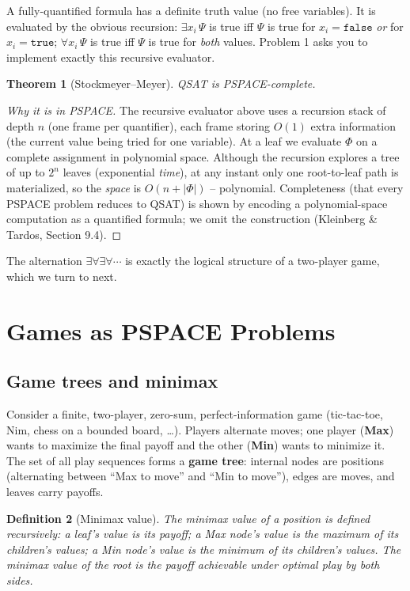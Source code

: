\documentclass[11pt]{article}
\newtheorem{theorem}{Theorem}[section]
\newtheorem{definition}[theorem]{Definition}
\begin{document}
A fully-quantified formula has a definite truth value (no free variables). It
is evaluated by the obvious recursion: $\exists x_i\,\Psi$ is true iff $\Psi$
is true for $x_i=\texttt{false}$ \emph{or} for $x_i=\texttt{true}$;
$\forall x_i\,\Psi$ is true iff $\Psi$ is true for \emph{both} values. Problem
1 asks you to implement exactly this recursive evaluator.

\begin{theorem}[Stockmeyer--Meyer]
QSAT is PSPACE-complete.
\end{theorem}

\begin{proof}[Why it is in PSPACE]
The recursive evaluator above uses a recursion stack of depth $n$ (one frame
per quantifier), each frame storing $O(1)$ extra information (the current value
being tried for one variable). At a leaf we evaluate $\Phi$ on a complete
assignment in polynomial space. Although the recursion explores a tree of up to
$2^n$ leaves (exponential \emph{time}), at any instant only one root-to-leaf
path is materialized, so the \emph{space} is $O(n + |\Phi|)$ -- polynomial.
Completeness (that every PSPACE problem reduces to QSAT) is shown by encoding
a polynomial-space computation as a quantified formula; we omit the
construction (Kleinberg \& Tardos, Section 9.4).
\end{proof}

The alternation $\exists\forall\exists\forall\cdots$ is exactly the logical
structure of a two-player game, which we turn to next.

\section{Games as PSPACE Problems}

\subsection{Game trees and minimax}

Consider a finite, two-player, zero-sum, perfect-information game (tic-tac-toe,
Nim, chess on a bounded board, \dots). Players alternate moves; one player
(\textbf{Max}) wants to maximize the final payoff and the other (\textbf{Min})
wants to minimize it. The set of all play sequences forms a \textbf{game tree}:
internal nodes are positions (alternating between ``Max to move'' and ``Min to
move''), edges are moves, and leaves carry payoffs.

\begin{definition}[Minimax value]
The \emph{minimax value} of a position is defined recursively: a leaf's value is
its payoff; a Max node's value is the \emph{maximum} of its children's values; a
Min node's value is the \emph{minimum} of its children's values. The minimax
value of the root is the payoff achievable under optimal play by both sides.
\end{definition}
\end{document}
